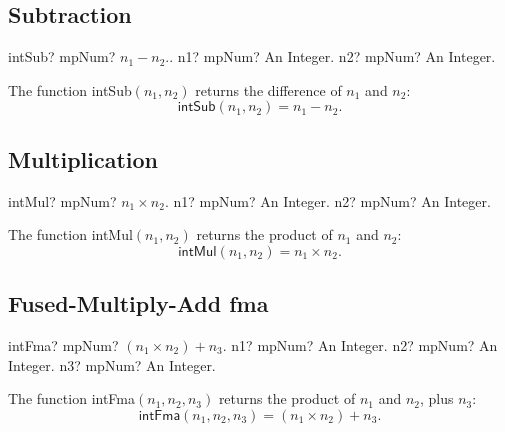 \subsection{Subtraction}

\begin{mpFunctionsExtract}
	\mpFunctionTwo
	{intSub? mpNum?  $n_1 - n_2.$.}
	{n1? mpNum? An Integer.}
	{n2? mpNum? An Integer.}
\end{mpFunctionsExtract}

\vspace{0.3cm}
The function \textsf{intSub$(n_1, n_2)$} returns the difference of $n_1$ and $n_2$: 
\begin{equation}
	\textsf{intSub}(n_1, n_2) =n_1 - n_2.
\end{equation}



\subsection{Multiplication}

\begin{mpFunctionsExtract}
	\mpFunctionTwo
	{intMul? mpNum?  $n_1  \times n_2$.}
	{n1? mpNum? An Integer.}
	{n2? mpNum? An Integer.}
\end{mpFunctionsExtract}

\vspace{0.3cm}
The function \textsf{intMul$(n_1, n_2)$} returns the product of $n_1$ and $n_2$: 
\begin{equation}
	\textsf{intMul}(n_1, n_2) =n_1 \times n_2.
\end{equation}



\subsection{Fused-Multiply-Add fma}

\begin{mpFunctionsExtract}
	\mpFunctionThree
	{intFma? mpNum? $(n_1 \times n_2) + n_3$.}
	{n1? mpNum? An Integer.}
	{n2? mpNum? An Integer.}
	{n3? mpNum? An Integer.}
\end{mpFunctionsExtract}

\vspace{0.3cm}
The function \textsf{intFma$(n_1, n_2, n_3)$} returns the product of $n_1$ and $n_2$, plus $n_3$: 
\begin{equation}
	\textsf{intFma}(n_1, n_2, n_3) =(n_1 \times n_2) + n_3.
\end{equation}




